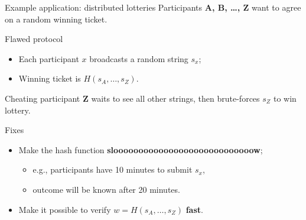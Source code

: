 \documentclass[aspectratio=169]{beamer}
\begin{document}
\begin{frame}{Example application: distributed lotteries}
  Participants \textbf{A, B, \dots, Z} want to agree on a random
  winning ticket.

  \begin{block}{Flawed protocol}
    \begin{itemize}
    \item Each participant \emph{$x$} broadcasts a random string
      \emph{$s_x$};
    \item Winning ticket is \emph{$H(s_A, \dots, s_Z)$}.
    \end{itemize}

    \pause
    
    Cheating participant \textbf{Z} waits to see all other strings,
    then brute-forces \emph{$s_Z$} to win lottery.
  \end{block}
  
  \pause

  \begin{block}{Fixes}
    \begin{itemize}
    \item Make the hash function \textbf{sloooooooooooooooooooooooooooow};
      \begin{itemize}
      \item e.g., participants have 10 minutes to submit $s_x$,
      \item outcome will be known after 20 minutes.
      \end{itemize}
    \item<4-> Make it possible to verify \emph{$w = H(s_A, \dots, s_Z)$} \textbf{fast}.
    \end{itemize}
  \end{block}
\end{frame}

\end{document}
